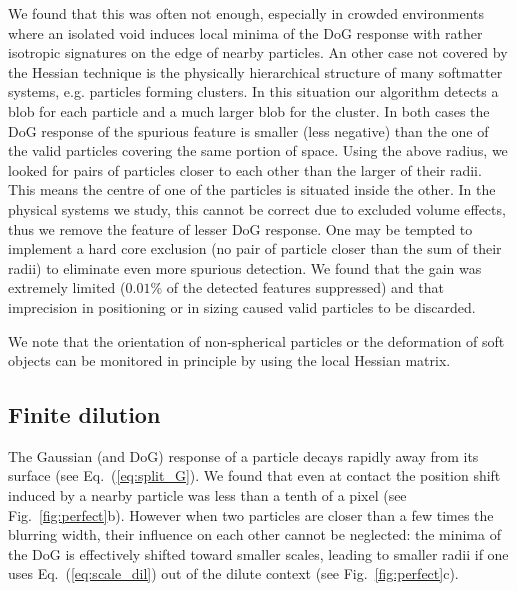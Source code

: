 \documentclass[8.5pt,twoside,twocolumn]{article}
\begin{document}
We found that this was often not enough, especially in crowded environments where an isolated void induces local minima of the DoG response with rather isotropic signatures on the edge of nearby particles. An other case not covered by the Hessian technique is the physically hierarchical structure of many softmatter systems, e.g. particles forming clusters. In this situation our algorithm detects a blob for each particle and a much larger blob for the cluster. In both cases the DoG response of the spurious feature is smaller (less negative) than the one of the valid particles covering the same portion of space. Using the above radius, we looked for pairs of particles closer to each other than the larger of their radii. This means the centre of one of the particles is situated inside the other. In the physical systems we study, this cannot be correct due to excluded volume effects, thus we remove the feature of lesser DoG response. One may be tempted to implement a hard core exclusion (no pair of particle closer than the sum of their radii) to eliminate even more spurious detection. We found that the gain was extremely limited ($0.01\%$ of the detected features suppressed) and that imprecision in positioning or in sizing caused valid particles to be discarded.

We note that the orientation of non-spherical particles or the deformation of soft objects can be monitored in principle by using the local Hessian matrix.

\subsection*{Finite dilution}
The Gaussian (and DoG) response of a particle decays rapidly away from its surface (see Eq.~(\ref{eq:split_G}). We found that even at contact the position shift induced by a nearby particle was less than a tenth of a pixel (see Fig.~\ref{fig:perfect}b). However when two particles are closer than a few times the blurring width, their influence on each other cannot be neglected: the minima of the DoG is effectively shifted toward smaller scales, leading to smaller radii if one uses Eq.~(\ref{eq:scale_dil}) out of the dilute context (see Fig.~\ref{fig:perfect}c).
\end{document}
